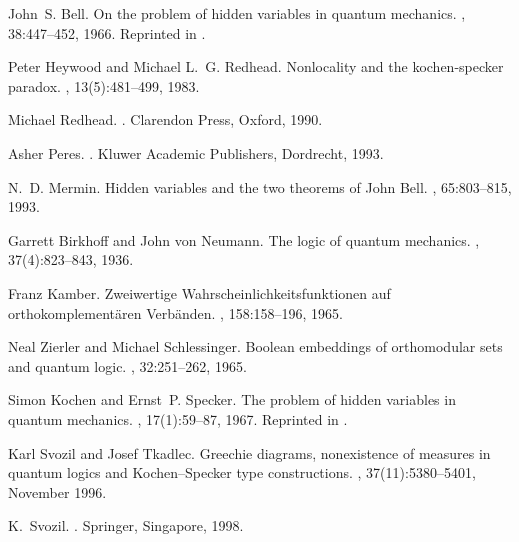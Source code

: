 

\begin{thebibliography}{10}

John~S. Bell.
\newblock On the problem of hidden variables in quantum mechanics.
, 38:447--452, 1966.
\newblock Reprinted in \cite[pp. 1-13]{bell-87}.

Peter Heywood and Michael L.~G. Redhead.
\newblock Nonlocality and the kochen-specker paradox.
, 13(5):481--499, 1983.

Michael Redhead.
.
\newblock Clarendon Press, Oxford, 1990.

Asher Peres.
.
\newblock Kluwer Academic Publishers, Dordrecht, 1993.

N.~D. Mermin.
\newblock Hidden variables and the two theorems of {J}ohn {B}ell.
, 65:803--815, 1993.

Garrett Birkhoff and John von Neumann.
\newblock The logic of quantum mechanics.
, 37(4):823--843, 1936.

Franz Kamber.
\newblock Zweiwertige {W}ahrscheinlichkeitsfunktionen auf
  orthokomplement{\"{a}}ren {V}erb{\"{a}}nden.
, 158:158--196, 1965.

Neal Zierler and Michael Schlessinger.
\newblock Boolean embeddings of orthomodular sets and quantum logic.
, 32:251--262, 1965.

Simon Kochen and Ernst~P. Specker.
\newblock The problem of hidden variables in quantum mechanics.
, 17(1):59--87, 1967.
\newblock Reprinted in \cite[pp. 235--263]{specker-ges}.

Karl Svozil and Josef Tkadlec.
\newblock Greechie diagrams, nonexistence of measures in quantum logics and
  {K}ochen--{S}pecker type constructions.
, 37(11):5380--5401, November
  1996.

K.~Svozil.
.
\newblock Springer, Singapore, 1998.


\end{thebibliography}
